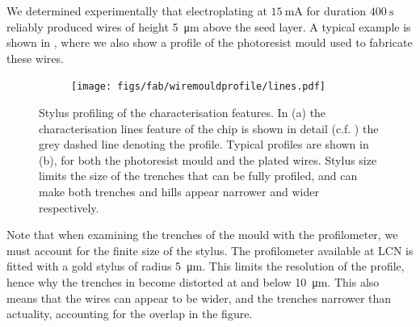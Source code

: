 We determined experimentally that electroplating at $\SI{15}{\milli\ampere}$
for duration $\SI{400}{\second}$ reliably produced wires of height
\SI{5}{\micro\meter} above the seed layer. A typical example is shown in
, where we also show a profile of the photoresist
mould used to fabricate these wires.

\begin{figure}[h]
  \centering
  \begin{subfigure}[b]{0.3\textwidth}
    \texttt{[image: figs/fab/wiremouldprofile/lines.pdf]}
    \vspace{1cm}
    \caption{}
  \end{subfigure}
  \hspace{1cm}
  \begin{subfigure}[b]{0.55\textwidth}
    \caption{}
  \end{subfigure}
  \caption[Stylus profiling characterisation features]{
    Stylus profiling of the characterisation features. In (a) the
  characterisation lines feature of the chip is shown in detail (c.f.
  ) the grey dashed line denoting the
  profile. Typical profiles are shown in (b), for both the photoresist
  mould and the plated wires. Stylus size limits the size of the trenches that
  can be fully profiled, and can make both trenches and hills appear narrower
  and wider respectively.
  }
  \label{fab:fig:chipprofile}
\end{figure}

Note that when examining the trenches of the mould with the profilometer, we
must account for the finite size of the stylus.
The profilometer available at LCN is fitted with a gold stylus of radius
\SI{5}{\micro\meter}. This limits the resolution of the profile, hence why the
trenches in  become distorted at and below
\SI{10}{\micro\meter}. This also means that the wires can appear to be 
wider, and the trenches narrower than actuality, accounting for the overlap in the
figure.

